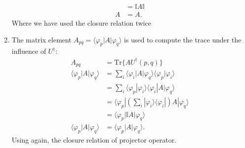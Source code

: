 \documentclass[letterpaper,11pt,twoside]{article}
\begin{document}
\begin{enumerate}[itemsep=0pt,topsep=0pt,label=\alph*.]
\begin{align*}
    &=\mathbb{I}A\mathbb{I}\\
    A&=A.
  \end{align*}
  Where we have used the closure relation twice
  \item The matrix element $A_{pq}=\langle\varphi_p|A|\varphi_q\rangle$ is used to compute the trace under the influence of $U^\dagger$:
  \begin{align*}
    A_{pq}&=\text{Tr}\{AU^\dagger(p,q)\}\\
    \langle\varphi_p|A|\varphi_q\rangle&=\sum_i \langle\varphi_i|A|\varphi_q\rangle\langle \varphi_p|\varphi_i\rangle\\
    &=\sum_i\langle\varphi_p|\varphi_i\rangle\langle\varphi_i|A|\varphi_q\rangle\\
    &=\langle\varphi_p|\left(\sum_i|\varphi_i\rangle\langle\varphi_i|\right)A|\varphi_q\rangle\\
    &=\langle\varphi_p|\mathbb{I}A|\varphi_q\rangle\\
    \langle\varphi_p|A|\varphi_q\rangle&=\langle\varphi_p|A|\varphi_q\rangle.
  \end{align*}
  Using again, the closure relation of projector operator.
\end{enumerate}




%
\end{document}
